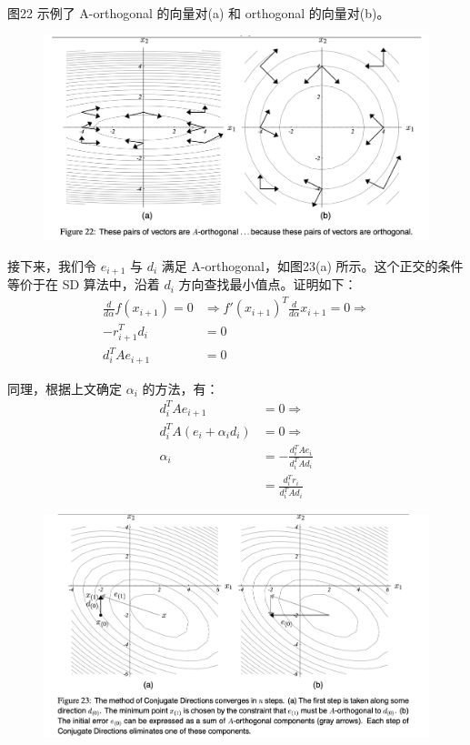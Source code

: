 \documentclass[12pt]{article}
\begin{document}
图22 示例了 A-orthogonal 的向量对(a) 和 orthogonal 的向量对(b)。
\begin{figure}[H]
    \centering
    \includegraphics[width=1\textwidth]{fig/CG_Convergence_CD_2.png}
\end{figure}

接下来，我们令 $e_{i+1}$ 与 $d_i$ 满足 A-orthogonal，如图23(a) 所示。这个正交的条件等价于在 SD 算法中，沿着 $d_i$ 方向查找最小值点。证明如下：
\begin{align*}
\frac{d}{d\alpha}f(x_{i+1}) = 0 &\Rightarrow f'(x_{i+1})^T \frac{d}{d\alpha}x_{i+1} = 0 \Rightarrow \\
-r^T_{i+1}d_i &= 0 \\
d^T_iAe_{i+1} &= 0
\end{align*}

同理，根据上文确定 $\alpha_i$ 的方法，有：
\begin{align*}
d^T_iAe_{i+1} &= 0 \Rightarrow \\
d^T_iA(e_i + \alpha_id_i) &= 0 \Rightarrow \\
\alpha_i &= -\frac{d^T_iAe_i}{d^T_iAd_i} \\
	&= \frac{d^T_ir_i}{d^T_iAd_i}
\end{align*}
\begin{figure}[H]
    \centering
    \includegraphics[width=1\textwidth]{fig/CG_Convergence_CD_3.png}
\end{figure}
\end{document}
